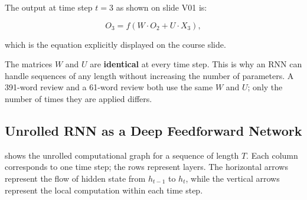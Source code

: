 \documentclass[12pt,a4paper]{article}
\begin{document}
The output at time step $t=3$ as shown on slide V01 is:

\begin{equation}
  O_3 = f\!\left(W \cdot O_2 + U \cdot X_3\right),
  \label{eq:o3}
\end{equation}

which is the equation explicitly displayed on the course slide.

\begin{keyinsight}[title=Parameter Sharing is the Key]
  The matrices $W$ and $U$ are \textbf{identical} at every time step.
  This is why an RNN can handle sequences of any length without
  increasing the number of parameters.  A 391-word review and a
  61-word review both use the same $W$ and $U$; only the number of
  times they are applied differs.
\end{keyinsight}

\subsection{Unrolled RNN as a Deep Feedforward Network}
\label{subsec:unrolled}

 shows the unrolled computational graph for a
sequence of length $T$.  Each column corresponds to one time step;
the rows represent layers.  The horizontal arrows represent the flow
of hidden state from $h_{t-1}$ to $h_t$, while the vertical arrows
represent the local computation within each time step.
\end{document}
